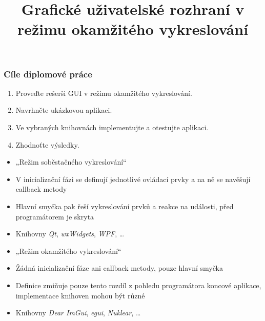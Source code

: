 \documentclass[FM]{tulpresentation} %
\title{Grafické uživatelské rozhraní v režimu okamžitého vykreslování}
\begin{document}
	\TULtitleframe
	
	\begin{frame}
		\frametitle{Cíle diplomové práce}
		\begin{enumerate}
			\item Proveďte rešerši GUI v režimu okamžitého vykreslování.
			\item Navrhněte ukázkovou aplikaci.
			\item Ve vybraných knihovnách implementujte a otestujte aplikaci.
			\item Zhodnoťte výsledky.
		\end{enumerate}
	\end{frame}

	\begin{frame}
		\begin{itemize}
			\item „Režim soběstačného vykreslování“
			\item V inicializační fázi se definují jednotlivé ovládací prvky a na ně se navěšují callback metody
			\item Hlavní smyčka pak řeší vykreslování prvků a reakce na události, před programátorem je skryta
			\item Knihovny \textit{Qt}, \textit{wxWidgets}, \textit{WPF}, \dots
		\end{itemize}
		\begin{itemize}
			\item „Režim okamžitého vykreslování“
			\item Žádná inicializační fáze ani callback metody, pouze hlavní smyčka
			\item Definice zmiňuje pouze tento rozdíl z pohledu programátora koncové aplikace, implementace knihoven mohou být různé
			\item Knihovny \textit{Dear ImGui}, \textit{egui}, \textit{Nuklear}, \dots
		\end{itemize}
	\end{frame}
	
	\begin{frame}[fragile]
	\subheader{RMGUI}
	
	\subheader{IMGUI}
	
	\end{frame}
	
\end{document}
